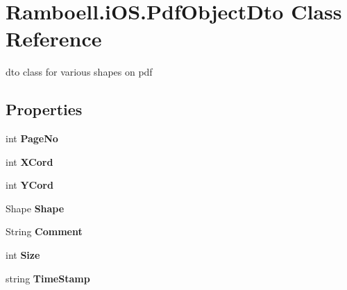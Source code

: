\hypertarget{class_ramboell_1_1i_o_s_1_1_pdf_object_dto}{}\section{Ramboell.\+i\+O\+S.\+Pdf\+Object\+Dto Class Reference}
\label{class_ramboell_1_1i_o_s_1_1_pdf_object_dto}


dto class for various shapes on pdf  


\subsection*{Properties}
\begin{DoxyCompactItemize}
\item 
\mbox{\label{class_ramboell_1_1i_o_s_1_1_pdf_object_dto_ac1b0c13c9a3b285fecaf6d8759b61dbd}} 
int {\bfseries Page\+No}
\item 
\mbox{\label{class_ramboell_1_1i_o_s_1_1_pdf_object_dto_a1d1f664048755f3e6b34dbe5306956e6}} 
int {\bfseries X\+Cord}
\item 
\mbox{\label{class_ramboell_1_1i_o_s_1_1_pdf_object_dto_a880e0df23348a34dcd4edac661664d3d}} 
int {\bfseries Y\+Cord}
\item 
\mbox{\label{class_ramboell_1_1i_o_s_1_1_pdf_object_dto_a85a9d5cf82f71284847839856c039eb1}} 
Shape {\bfseries Shape}
\item 
\mbox{\label{class_ramboell_1_1i_o_s_1_1_pdf_object_dto_a0f72dca69323415d65f9df0e31f051a7}} 
String {\bfseries Comment}
\item 
\mbox{\label{class_ramboell_1_1i_o_s_1_1_pdf_object_dto_a25e25302afe6dfc8f375006bbe5ae1f0}} 
int {\bfseries Size}
\item 
\mbox{\label{class_ramboell_1_1i_o_s_1_1_pdf_object_dto_abdeaf46c2ff02cdbb35cbefaa49ddc11}} 
string {\bfseries Time\+Stamp}
\end{DoxyCompactItemize}


